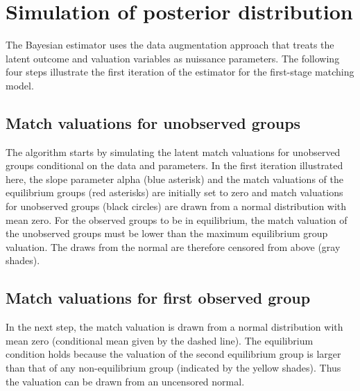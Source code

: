 \section{Simulation of posterior distribution} \label{Appendix:Simulation}


The Bayesian estimator uses the data augmentation approach \citep[proposed by][]{Albert1993} that treats the latent outcome and valuation variables as nuissance parameters.
The following four steps illustrate the first iteration of the estimator for the first-stage matching model. 

\subsection{Match valuations for unobserved groups}

The algorithm starts by simulating the latent match valuations for unobserved groups conditional on the data and parameters. In the first iteration illustrated here, the slope parameter alpha (blue asterisk) and the match valuations of the equilibrium groups (red asterisks) are initially set to zero and match valuations for unobserved groups (black circles) are drawn from a normal distribution with mean zero.
For the observed groups to be in equilibrium, the match valuation of the unobserved groups must be lower than the maximum equilibrium group valuation. The draws from the normal are therefore censored from above (gray shades).

\subsection{Match valuations for first observed group}


In the next step, the match valuation is drawn from a normal distribution with mean zero (conditional mean given by the dashed line). 
The equilibrium condition holds because the valuation of the second equilibrium group is larger than that of any non-equilibrium group (indicated by the yellow shades). Thus the valuation can be drawn from an uncensored normal. 


